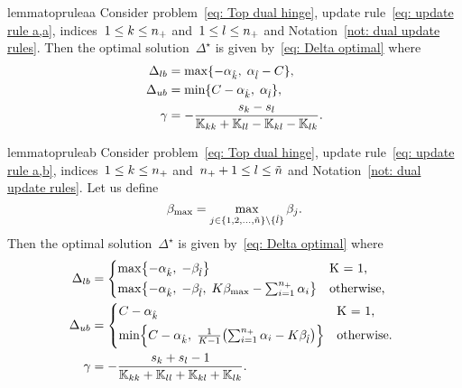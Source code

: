 \begin{restatable}{lemma}{topruleaa}\label{thm: toppushk family hinge update a,a}
  Consider problem~\eqref{eq: Top dual hinge}, update rule~\eqref{eq: update rule a,a}, indices~$1 \leq k \leq n_{+}$ and~$1 \leq l \leq n_{+}$ and Notation~\ref{not: dual update rules}. Then the optimal solution~$\Delta^{\star}$ is given by~\eqref{eq: Delta optimal} where
  \begin{align*}
    \Delta_{lb} & = \max\{- \alpha_{\hat{k}},\; \alpha_{\hat{l}} - C\}, \\
    \Delta_{ub} & = \min\{C - \alpha_{\hat{k}},\; \alpha_{\hat{l}} \}, \\
    \gamma & = -\frac{s_k - s_l}{\mathbb{K}_{kk} + \mathbb{K}_{ll} - \mathbb{K}_{kl} - \mathbb{K}_{lk}}.
  \end{align*}
\end{restatable}

\begin{restatable}{lemma}{topruleab}\label{thm: toppushk family hinge update a,b}
  Consider problem~\eqref{eq: Top dual hinge}, update rule~\eqref{eq: update rule a,b}, indices~$1 \leq k \leq n_{+}$ and~$n_{+} + 1 \leq l \leq \tilde{n}$ and Notation~\ref{not: dual update rules}. Let us define
  \begin{equation*}
    \beta_{\max} = \max_{j \in \{1, 2, \ldots, \tilde{n} \} \setminus \{\hat{l}\}} \beta_j.
  \end{equation*}
  Then the optimal solution~$\Delta^{\star}$ is given by~\eqref{eq: Delta optimal} where
  \begin{align*}
    \Delta_{lb} & = 
      \begin{cases*}
        \max \Brac[c]{- \alphak, \;  -\betal} & K = 1, \\
        \max \Brac[c]{- \alphak, \;  -\betal, \; K\beta_{\max} - \sum_{i = 1}^{\npos} \alpha_i} & \textrm{otherwise},
      \end{cases*} \\
    \Delta_{ub} & = 
      \begin{cases*}
          C - \alphak & K = 1, \\
          \min \Brac[c]{C - \alphak, \; \frac{1}{K-1}\Brac{\sum_{i = 1}^{\npos} \alpha_i - K \betal}}  & \textrm{otherwise}.
      \end{cases*} \\
    \gamma & = - \frac{s_k + s_l - 1}{\K_{kk} + \K_{ll} + \K_{kl} + \K_{lk}}.
  \end{align*}
\end{restatable}

